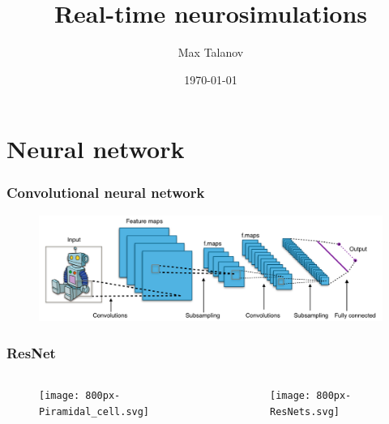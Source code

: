 \documentclass[12pt, aspectratio=169]{beamer}
\title[Real-time neurosimulations]{Real-time neurosimulations} %
\author[Max Talanov]{
  Max Talanov
}
\institute[B-Rain Labs LLC, NcN laboratory: ITIS : KFU]%
{
B-Rain Labs LLC, Neuromorphic computing and Neurosimulations laboratory, ITIS, KFU \\ %
\medskip
\textit{max.talanov@gmail.com} %
}
\date{\today} %
\begin{document}
\begin{frame}
\titlepage %
\end{frame}



\section{Neural network}
\begin{frame}
  \frametitle{Convolutional neural network}
  \begin{figure}
    \includegraphics[width=0.9\linewidth]{Typical_cnn}
  \end{figure}
\end{frame}



\begin{frame}
  \frametitle{ResNet}
  \begin{columns}
    \begin{column}{0.45\textwidth}
      \begin{figure}
        \texttt{[image: 800px-Piramidal\_cell.svg]}
      \end{figure}
    \end{column}
    \begin{column}{0.55\textwidth}
      \texttt{[image: 800px-ResNets.svg]}
    \end{column}
  \end{columns}
\end{frame}
\end{document}
